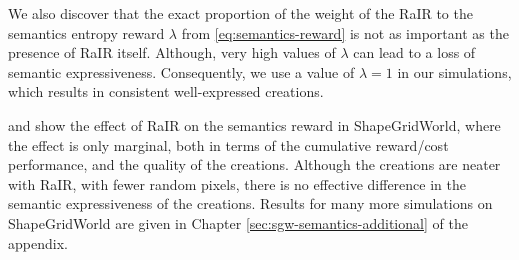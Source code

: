 We also discover that the exact proportion of the weight of the RaIR to the semantics entropy reward \(\lambda\) from \eqref{eq:semantics-reward} is not as important as the presence of RaIR itself.
Although, very high values of \(\lambda\) can lead to a loss of semantic expressiveness.
Consequently, we use a value of \(\lambda = 1\) in our simulations, which results in consistent well-expressed creations.

 and  show the effect of RaIR on the semantics reward in ShapeGridWorld, where the effect is only marginal, both in terms of the cumulative reward/cost performance, and the quality of the creations.
Although the creations are neater with RaIR, with fewer random pixels, there is no effective difference in the semantic expressiveness of the creations.
Results for many more simulations on ShapeGridWorld are given in Chapter \ref{sec:sgw-semantics-additional} of the appendix.

